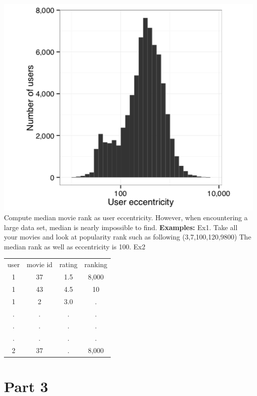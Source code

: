 \begingroup\centering
\includegraphics{figures/ddd}\\
\endgroup
\noindent Compute median movie rank as user eccentricity. However, when encountering a large data set, median is nearly impossible to find.
\newline\textbf{Examples:}
\newline Ex1.
\newline Take all your movies and look at popularity rank such as following
(3,7,100,120,9800)
\newline The median rank as well as eccentricity is 100.
\newline Ex2
\newline
\begin{tabular}{cccc}
user & movie id & rating & ranking \\
1 & 37 & 1.5 & 8,000 \\
1 & 43 & 4.5 & 10 \\
1 & 2 & 3.0 & . \\
. & . & . & . \\
. & . & . & . \\
. & . & . & . \\
2 & 37 & . & 8,000
\end{tabular}

\section{Part 3}
